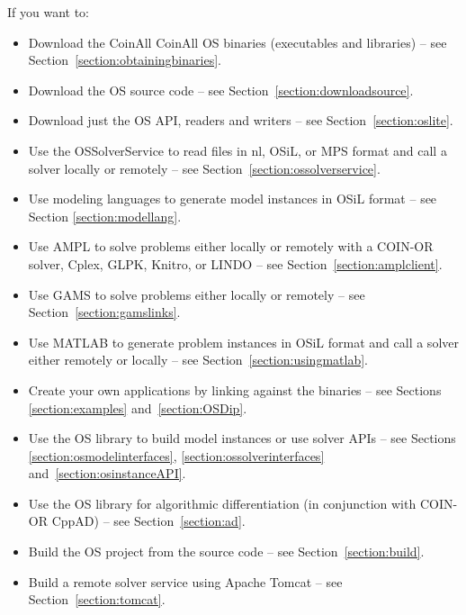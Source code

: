 \label{section:roadmap}

If you want to:

\begin{itemize}
\item Download the 
\ifruncode CoinAll
   \ifuselibs CoinAll
   \else OS \fi
\fi
binaries  (executables and libraries) -- see Section~\ref{section:obtainingbinaries}.

\ifdevelop
\item Download the OS source code -- see Section~\ref{section:downloadsource}.

\item Download just the OS API, readers and writers -- see Section~\ref{section:oslite}.
\fi

\item Use the OSSolverService to read files in nl, OSiL, 
or MPS format and call a solver locally or remotely -- see Section~\ref{section:ossolverservice}.

\item Use modeling languages to generate model instances in OSiL format -- see Section \ref{section:modellang}.

\item Use AMPL to solve problems either locally or remotely
with a COIN-OR solver, Cplex,
GLPK, \ifknitro Knitro, \fi
or LINDO -- see Section~\ref{section:amplclient}.

\item Use GAMS to solve problems either locally or remotely -- see Section~\ref{section:gamslinks}.

\ifruncode\else
\item Use MATLAB to generate problem instances in OSiL format 
and call a solver either remotely or locally -- see Section~\ref{section:usingmatlab}.

\item Create your own applications by linking against the binaries -- see Sections \ref{section:examples} and~\ref{section:OSDip}.

\item Use the OS library to build model instances or use solver APIs -- see Sections \ref{section:osmodelinterfaces},
\ref{section:ossolverinterfaces} and~\ref{section:osinstanceAPI}.

\item Use the OS library for algorithmic differentiation (in conjunction with 
COIN-OR CppAD) -- see Section~\ref{section:ad}.

\item 
\ifuselibs\else Build the OS project from the source code -- see Section~\ref{section:build}.
\fi
\fi

\ifdevelop
\item Build a remote solver service using Apache Tomcat -- see Section~\ref{section:tomcat}.
\fi
\end{itemize}

